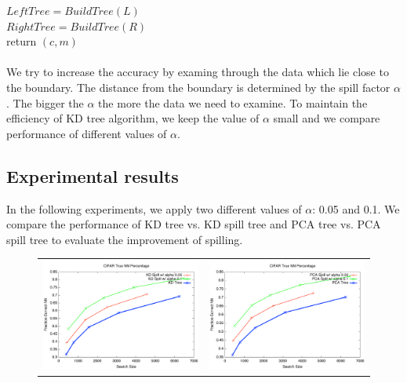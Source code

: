 \documentclass[paper=letter, fontsize=12pt]{article} %
\begin{document}
\hspace*{2em} $LeftTree = BuildTree(L)$\\
\hspace*{2em} $RightTree = BuildTree(R)$\\
\hspace*{2em} return $(c,m)$
\\~\\
\hspace*{2em} We try to increase the accuracy by examing through the data which lie close to the boundary. The distance from the boundary is determined by the spill factor $\alpha$. The bigger the $\alpha$ the more the data we need to examine. To maintain the efficiency of KD tree algorithm, we keep the value of $\alpha$ small and we compare performance of different values of $\alpha$.


\subsection{Experimental results}
In the following experiments, we apply two different values of $\alpha$: 0.05 and 0.1. We compare the performance of KD tree vs. KD spill tree and PCA tree vs. PCA spill tree to evaluate the improvement of spilling.
\begin{figure}[h]
   \centering
   \begin{tabular}{c c}
   	\includegraphics[width=.5\textwidth]{kd_vs_spill.pdf} &
   	\includegraphics[width=.5\textwidth]{pca_vs_spill.pdf}
   \end{tabular}
\end{figure}
\end{document}

